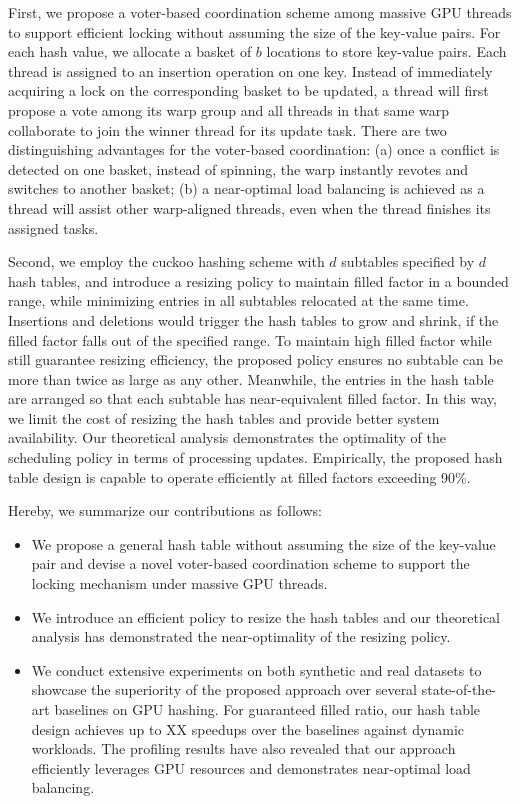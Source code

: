 First, we propose a voter-based coordination scheme among massive GPU threads to support efficient locking without assuming the size of the key-value pairs.
For each hash value, we allocate a basket of $b$ locations to store key-value pairs. 
Each thread is assigned to an insertion operation on one key. Instead of immediately acquiring a lock on the corresponding basket to be updated, a thread will first propose a vote among its warp group and all threads in that same warp collaborate to join the winner thread for its update task. There are two distinguishing advantages for the voter-based coordination: (a) once a conflict is detected on one basket, instead of spinning, the warp instantly revotes and switches to another basket; (b) a near-optimal load balancing is achieved as a thread will assist other warp-aligned threads, even when the thread finishes its assigned tasks.

Second, we employ the cuckoo hashing scheme with $d$ subtables specified by $d$ hash tables, and introduce a resizing policy to maintain filled factor in a bounded range, while minimizing entries in all subtables relocated at the same time. Insertions and deletions would trigger the hash tables to grow and shrink, if the filled factor falls out of the specified range. To maintain high filled factor while still guarantee resizing efficiency, the proposed policy ensures no subtable can be more than twice as large as any other. Meanwhile, the entries in the hash table are arranged so that each subtable has near-equivalent filled factor.
 In this way, we limit the cost of resizing the hash tables and provide better system availability.
Our theoretical analysis demonstrates the optimality of the scheduling policy in terms of processing updates. 
Empirically, the proposed hash table design is capable to operate efficiently at filled factors exceeding 90\%.

Hereby, we summarize our contributions as follows:
\begin{itemize}
	\item We propose a general hash table without assuming the size of the key-value pair and devise a novel voter-based coordination scheme to support the locking mechanism under massive GPU threads. 
	\item We introduce an efficient policy to resize the hash tables and our theoretical analysis has demonstrated the near-optimality of the resizing policy.
	\item We conduct extensive experiments on both synthetic and real datasets to showcase the superiority of the proposed approach over several state-of-the-art baselines on GPU hashing. 
	For guaranteed filled ratio, our hash table design achieves up to XX speedups over the baselines against dynamic workloads. The profiling results have also revealed that our approach efficiently leverages GPU resources and demonstrates near-optimal load balancing. 
\end{itemize}


